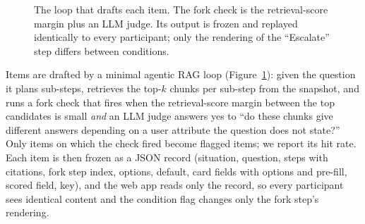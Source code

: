 \documentclass[sigconf,nonacm]{acmart}
\begin{document}
\begin{figure}[t]
\centering
{}
\caption{The loop that drafts each item. The fork check is the
retrieval-score margin plus an LLM judge. Its output is frozen and replayed
identically to every participant; only the rendering of the ``Escalate''
step differs between conditions.}
\label{fig:loop}
\end{figure}

Items are drafted by a minimal agentic RAG loop (Figure~\ref{fig:loop}):
given the question it plans sub-steps, retrieves the top-$k$ chunks per
sub-step from the snapshot, and runs a fork check that fires when the
retrieval-score margin
between the top candidates is small \emph{and} an LLM judge answers yes to
``do these chunks give different answers depending on a user attribute the
question does not state?'' Only items on which the check fired become
flagged items; we report its hit rate. Each item is then frozen as a JSON
record (situation, question, steps with citations, fork step index,
options, default, card fields with options and pre-fill, scored field,
key), and the web app reads only the record, so every participant sees
identical content and the condition flag changes only the fork step's
rendering.
\end{document}
